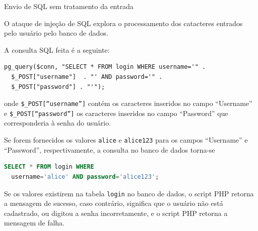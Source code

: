 
\begin{frame}[fragile]{}{Envio de SQL sem tratamento da entrada}

O ataque de injeção de SQL explora o processamento dos catacteres entrados pelo usuário pelo 
 banco de dados.  

\pause
A consulta SQL feita é a seguinte:

{\small
\begin{verbatim}
pg_query($conn, "SELECT * FROM login WHERE username='" . 
  $_POST["username"]  . "' AND password='" . 
  $_POST["password"] . "'");
\end{verbatim}
}

onde {\tt \$\_POST[``username'']} contém os caracteres
inseridos no campo ``Username'' e {\tt \$\_POST[``password'']} os
caracteres inseridos no campo ``Password'' que corresponderia à senha
do usuário.

\end{frame}

\begin{frame}[fragile]{}

Se forem fornecidos os valores {\tt alice} e {\tt alice123} para os
campos ``Username'' e ``Password'', respectivamente, a consulta no
banco de dados torna-se

\begin{lstlisting}[language=SQL]
SELECT * FROM login WHERE 
  username='alice' AND password='alice123';
\end{lstlisting}

\end{frame}

\begin{frame}{}

  Se os valores existirem na tabela {\tt login} no banco de dados, o
script PHP retorna a mensagem de sucesso, caso contrário, significa
que o usuário não está cadastrado, ou digitou a senha incorretamente,
e o script PHP retorna a mensagem de falha.
\end{frame}

